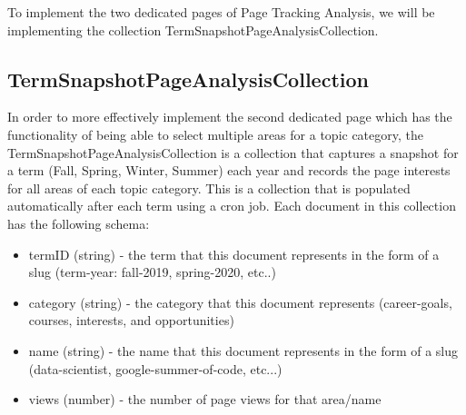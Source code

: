 \documentclass[english]{proposalnsf}
\begin{document}
    To implement the two dedicated pages of Page Tracking Analysis, we will be implementing the collection TermSnapshotPageAnalysisCollection.

    \subsection{TermSnapshotPageAnalysisCollection}
    \label{sec:termsnapshotpageanalysiscollection}
    In order to more effectively implement the second dedicated page which has the functionality of being able to select multiple areas for a topic category, the TermSnapshotPageAnalysisCollection is a collection that captures a snapshot for a term (Fall, Spring, Winter, Summer) each year and records the page interests for all areas of each topic category. This is a collection that is populated automatically after each term using a cron job. Each document in this collection has the following schema:
    \begin{itemize}
        \item termID (string) - the term that this document represents in the form of a slug (term-year: fall-2019, spring-2020, etc..)
        \item category (string) - the category that this document represents (career-goals, courses, interests, and opportunities)
        \item name (string) - the name that this document represents in the form of a slug (data-scientist, google-summer-of-code, etc...)
        \item views (number) - the number of page views for that area/name
    \end{itemize}
\end{document}
